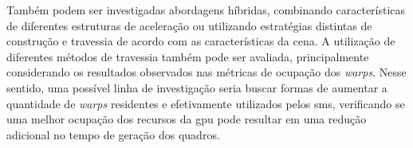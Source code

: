 Também podem ser investigadas abordagens híbridas, combinando características de diferentes estruturas de aceleração ou utilizando estratégias distintas de construção e travessia de acordo com as características da cena. A utilização de diferentes métodos de travessia também pode ser avaliada, principalmente considerando os resultados observados nas métricas de ocupação dos \textit{warps}. Nesse sentido, uma possível linha de investigação seria buscar formas de aumentar a quantidade de \textit{warps} residentes e efetivamente utilizados pelos \glspl{sm}, verificando se uma melhor ocupação dos recursos da \gls{gpu} pode resultar em uma redução adicional no tempo de geração dos quadros.
